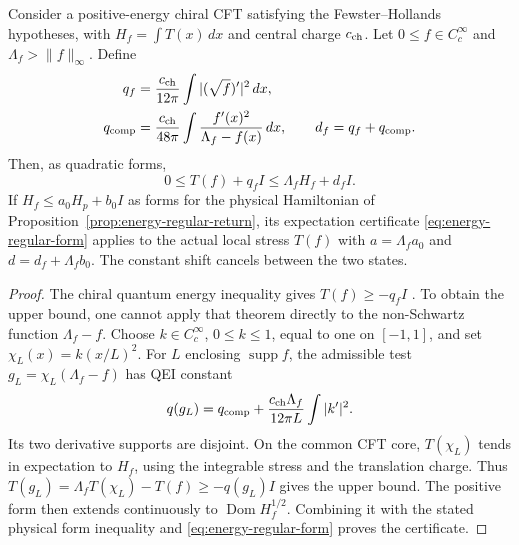 \begin{proposition}
\label{prop:smooth-stress-certificate}
Consider a positive-energy chiral CFT satisfying the
Fewster--Hollands hypotheses, with $H_f=\int T(x)\,dx$ and central
charge $c_{\rm ch}$. Let $0\le f\in C_c^\infty$ and
$\Lambda_f>\|f\|_\infty$. Define
\begin{align}
 q_f&=\frac{c_{\rm ch}}{12\pi}\int|(\sqrt f)'|^2\,dx,\nonumber\\
 q_{\rm comp}&=\frac{c_{\rm ch}}{48\pi}
       \int\frac{f'(x)^2}{\Lambda_f-f(x)}\,dx,\qquad
 d_f=q_f+q_{\rm comp}. \label{eq:stress-shift}
\end{align}
Then, as quadratic forms,
\begin{equation}\label{eq:stress-energy-form}
 0\le T(f)+q_f I\le\Lambda_f H_f+d_f I.
\end{equation}
If $H_f\le a_0H_p+b_0I$ as forms for the physical Hamiltonian of
Proposition~\ref{prop:energy-regular-return}, its expectation
certificate \eqref{eq:energy-regular-form} applies to the actual
local stress $T(f)$ with $a=\Lambda_f a_0$ and
$d=d_f+\Lambda_f b_0$. The constant shift cancels between the
two states.
\end{proposition}
\begin{proof}
The chiral quantum energy inequality gives $T(f)\ge-q_fI$
\cite[Theorem 4.1]{FewsterHollands2005}. To obtain the upper bound,
one cannot apply that theorem directly to the non-Schwartz function
$\Lambda_f-f$. Choose $k\in C_c^\infty$, $0\le k\le1$, equal to
one on $[-1,1]$, and set $\chi_L(x)=k(x/L)^2$. For $L$ enclosing
$\operatorname{supp}f$, the admissible test
$g_L=\chi_L(\Lambda_f-f)$ has QEI constant
\[
 q(g_L)=q_{\rm comp}+
       \frac{c_{\rm ch}\Lambda_f}{12\pi L}\int|k'|^2.
\]
Its two derivative supports are disjoint. On the common CFT core,
$T(\chi_L)$ tends in expectation to $H_f$, using the integrable
stress and the translation charge. Thus
$T(g_L)=\Lambda_fT(\chi_L)-T(f)\ge-q(g_L)I$ gives the upper bound.
The positive form then extends continuously to
$\operatorname{Dom}H_f^{1/2}$. Combining it with the stated
physical form inequality and \eqref{eq:energy-regular-form}
proves the certificate.
\end{proof}

